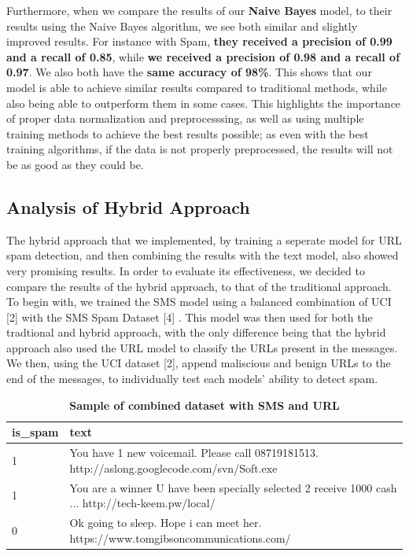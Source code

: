 \documentclass{article}
\begin{document}
\noindent
Furthermore, when we compare the results of our \textbf{Naive Bayes} model, to their results using the Naive Bayes algorithm, we see both similar and slightly improved results. For instance with Spam, \textbf{they received a precision of 0.99 and a recall of 0.85}, while \textbf{we received a precision of 0.98 and a recall of 0.97}. We also both have the \textbf{same accuracy of 98\%}. This shows that our model is able to achieve similar results compared to traditional methods, while also being able to outperform them in some cases. This highlights the importance of proper data normalization and preprocesssing, as well as using multiple training methods to achieve the best results possible; as even with the best training algorithms, if the data is not properly preprocessed, the results will not be as good as they could be.

\subsection{Analysis of Hybrid Approach}

\noindent
The hybrid approach that we implemented, by training a seperate model for URL spam detection, and then combining the results with the text model, also showed very promising results. In order to evaluate its effectiveness, we decided to compare the results of the hybrid approach, to that of the traditional approach. To begin with, we trained the SMS model using a balanced combination of UCI [2] with the SMS Spam Dataset [4] . This model was then used for both the tradtional and hybrid approach, with the only difference being that the hybrid approach also used the URL model to classify the URLs present in the messages. We then, using the UCI dataset [2], append maliscious and benign URLs to the end of the messages, to individually test each models' ability to detect spam. 


\begin{table}[htbp]
    \centering
    \caption{\textbf{Sample of combined dataset with SMS and URL}}
    \begin{tabular}{ll}
    \toprule
    is\_spam & text \\
    \midrule
    1 & You have 1 new voicemail. Please call 08719181513. http://aslong.googlecode.com/svn/Soft.exe \\
    1 & You are a winner U have been specially selected 2 receive 1000 cash ... http://tech-keem.pw/local/ \\ 
    0 & Ok going to sleep. Hope i can meet her. https://www.tomgibsoncommunications.com/ \\
    \bottomrule
    \end{tabular}
    \label{tab:csv_sample}
\end{table}
\end{document}
